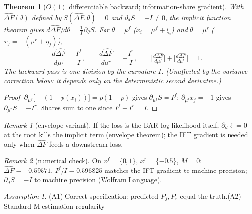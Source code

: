\documentclass[11pt]{article}
\theoremstyle{plain}
\newtheorem{theorem}{Theorem}
\theoremstyle{remark}
\newtheorem{remark}{Remark}
\newtheorem{assumption}{Assumption}
\newcommand{\dFh}{\widehat{\Delta F}}
\begin{document}
\begin{theorem}[$O(1)$ differentiable backward; information-share gradient]\label{thm:backward}
With $\dFh(\theta)$ defined by $S(\dFh,\theta)=0$ and $\partial_d S=-I\neq0$, the implicit function theorem gives
$d\dFh/d\theta=\tfrac1I\,\partial_\theta S$. For $\theta=\mu^f$ ($x_i=\mu^f+\xi_i$) and $\theta=\mu^r$ ($x_j=-(\mu^r+\eta_j)$),
\[
\frac{d\dFh}{d\mu^f}=\frac{I^f}{I},\qquad \frac{d\dFh}{d\mu^r}=-\frac{I^r}{I},\qquad
\Big|\tfrac{d\dFh}{d\mu^f}\Big|+\Big|\tfrac{d\dFh}{d\mu^r}\Big|=1 .
\]
The backward pass is one division by the curvature $I$. (Unaffected by the variance correction below: it depends only on the deterministic second derivative.)
\end{theorem}
\begin{proof}
$\partial_{\mu^f}\!\big[-(1-p(x_i))\big]=p(1-p)$ gives $\partial_{\mu^f}S=I^f$; $\partial_{\mu^r}x_j=-1$ gives $\partial_{\mu^r}S=-I^r$. Shares sum to one since $I^f+I^r=I$.
\end{proof}
\begin{remark}[envelope variant]
If the loss is the BAR log-likelihood itself, $\partial_d\ell=0$ at the root kills the implicit term (envelope theorem); the IFT gradient is needed only when $\dFh$ feeds a downstream loss.
\end{remark}
\begin{remark}[numerical check]
On $x^f=\{0,1\}$, $x^r=\{-0.5\}$, $M=0$: $\dFh=-0.59571$, $I^f/I=0.596825$ matches the IFT gradient to machine precision; $\partial_dS=-I$ to machine precision (Wolfram Language).
\end{remark}

\begin{assumption}\label{ass:spec}
(A1) Correct specification: predicted $P_f,P_r$ equal the truth.\quad (A2) Standard M-estimation regularity.
\end{assumption}
\end{document}
